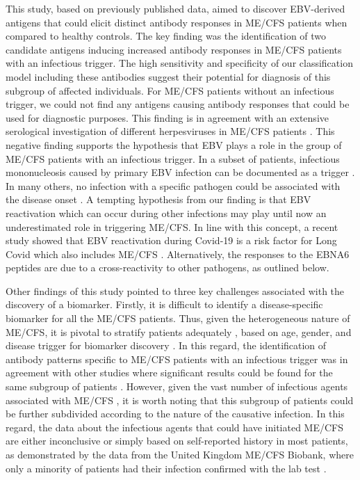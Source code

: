 This study, based on previously published data, aimed to discover EBV-derived antigens that could elicit distinct antibody responses in ME/CFS patients when compared to healthy controls. The key finding was the identification of two candidate antigens inducing increased antibody responses in ME/CFS patients with an infectious trigger. The high sensitivity and specificity of our classification model including these antibodies suggest their potential for diagnosis of this subgroup of affected individuals. For ME/CFS patients without an infectious trigger, we could not find any antigens causing antibody responses that could be used for diagnostic purposes. This finding is in agreement with an extensive serological investigation of different herpesviruses in ME/CFS patients \citep{blombergAntibodiesHumanHerpesviruses2019}. This negative finding supports the hypothesis that EBV plays a role in the group of ME/CFS patients with an infectious trigger. In a subset of patients, infectious mononucleosis caused by primary EBV infection can be documented as a trigger \citep{domingues2021HerpesvirusesSerologya}. In many others, no infection with a specific pathogen could be associated with the disease onset \citep{rasa2018ChronicViral}. A tempting hypothesis from our finding is that EBV reactivation which can occur during other infections may play until now an underestimated role in triggering ME/CFS. In line with this concept, a recent study showed that EBV reactivation during Covid-19 is a risk factor for Long Covid which also includes ME/CFS \citep{su2022MultipleEarly}. Alternatively, the responses to the EBNA6 peptides are due to a cross-reactivity to other pathogens, as outlined below.

Other findings of this study pointed to three key challenges associated with the discovery of a biomarker. Firstly, it is difficult to identify a disease-specific biomarker for all the ME/CFS patients. Thus, given the heterogeneous nature of ME/CFS, it is pivotal to stratify patients adequately \citep{jason2005ChronicFatigue}, based on age, gender, and disease trigger for biomarker discovery \citep{scheibenbogen2017EuropeanME}. In this regard, the identification of antibody patterns specific to ME/CFS patients with an infectious trigger was in agreement with other studies where significant results could be found for the same subgroup of patients \citep{steiner2020AutoimmunityRelatedRisk, domingues2021HerpesvirusesSerologya, szklarski2021DelineatingAssociationa}. However, given the vast number of infectious agents associated with ME/CFS \citep{rasa2018ChronicViral, blomberg2018InfectionEliciteda}, it is worth noting that this subgroup of patients could be further subdivided according to the nature of the causative infection. In this regard, the data about the infectious agents that could have initiated ME/CFS are either inconclusive or simply based on self-reported history in most patients, as demonstrated by the data from the United Kingdom ME/CFS Biobank, where only a minority of patients had their infection confirmed with the lab test \citep{domingues2021HerpesvirusesSerologya}.%

